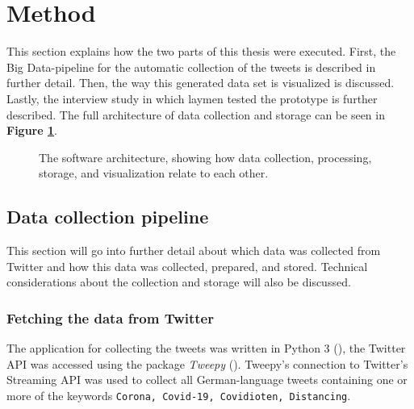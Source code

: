 \section{Method}
This section explains how the two parts of this thesis were executed. First, the Big Data-pipeline for the automatic collection of the tweets is described in further detail. Then, the way this generated data set is visualized is discussed. Lastly, the interview study in which laymen tested the prototype is further described. The full architecture of data collection and storage can be seen in \textbf{Figure \ref{fig:architecture}}.

\begin{figure}[htb]
    \caption{The software architecture, showing how data collection, processing, storage, and visualization relate to each other.}
    \label{fig:architecture}
\end{figure}

\subsection{Data collection pipeline}
This section will go into further detail about which data was collected from Twitter and how this data was collected, prepared, and stored. Technical considerations about the collection and storage will also be discussed.

\subsubsection{Fetching the data from Twitter} \label{sec:fetchedData}
The application for collecting the tweets was written in Python 3 (\cite{10.5555/1593511}), the Twitter API was accessed using the package \emph{Tweepy} (\cite{roesslein2020tweepy}). Tweepy's connection to Twitter's Streaming API was used to collect all German-language tweets containing one or more of the keywords \verb+Corona, Covid-19, Covidioten, Distancing+.

